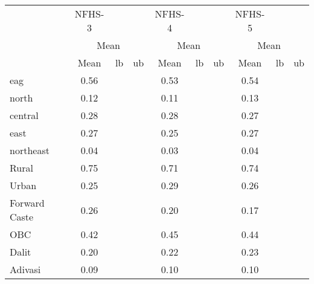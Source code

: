 {
\def\sym#1{\ifmmode^{#1}\else\(^{#1}\)\fi}
\begin{tabular}{l*{3}{ccc}}
\hline\hline
                    &      NFHS-3&            &            &      NFHS-4&            &            &      NFHS-5&            &            \\
                    &\multicolumn{3}{c}{Mean}              &\multicolumn{3}{c}{Mean}              &\multicolumn{3}{c}{Mean}              \\
                    &        Mean&          lb&          ub&        Mean&          lb&          ub&        Mean&          lb&          ub\\
\hline
eag                 &        0.56&            &            &        0.53&            &            &        0.54&            &            \\
north               &        0.12&            &            &        0.11&            &            &        0.13&            &            \\
central             &        0.28&            &            &        0.28&            &            &        0.27&            &            \\
east                &        0.27&            &            &        0.25&            &            &        0.27&            &            \\
northeast           &        0.04&            &            &        0.03&            &            &        0.04&            &            \\
Rural               &        0.75&            &            &        0.71&            &            &        0.74&            &            \\
Urban               &        0.25&            &            &        0.29&            &            &        0.26&            &            \\
Forward Caste       &        0.26&            &            &        0.20&            &            &        0.17&            &            \\
OBC                 &        0.42&            &            &        0.45&            &            &        0.44&            &            \\
Dalit               &        0.20&            &            &        0.22&            &            &        0.23&            &            \\
Adivasi             &        0.09&            &            &        0.10&            &            &        0.10&            &            \\

\end{tabular}}
